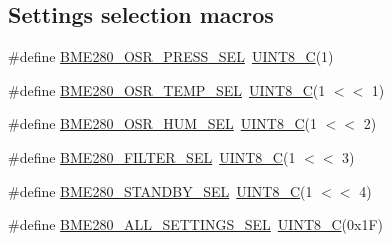 \subsection*{Settings selection macros}
\begin{DoxyCompactItemize}
\item 
\#define \hyperlink{group___b_m_e280_gae22bd3e6b1bb71fe30633f4d84168750}{B\+M\+E280\+\_\+\+O\+S\+R\+\_\+\+P\+R\+E\+S\+S\+\_\+\+S\+EL}~\hyperlink{group___b_m_e280_gacd2aa09844a8a245cf7fdbb808e215e5}{U\+I\+N\+T8\+\_\+C}(1)
\item 
\#define \hyperlink{group___b_m_e280_ga407647f6182e1bd2338e226ea0ef93af}{B\+M\+E280\+\_\+\+O\+S\+R\+\_\+\+T\+E\+M\+P\+\_\+\+S\+EL}~\hyperlink{group___b_m_e280_gacd2aa09844a8a245cf7fdbb808e215e5}{U\+I\+N\+T8\+\_\+C}(1 $<$$<$ 1)
\item 
\#define \hyperlink{group___b_m_e280_gacdab9f807404ce931f3ec87b680986ba}{B\+M\+E280\+\_\+\+O\+S\+R\+\_\+\+H\+U\+M\+\_\+\+S\+EL}~\hyperlink{group___b_m_e280_gacd2aa09844a8a245cf7fdbb808e215e5}{U\+I\+N\+T8\+\_\+C}(1 $<$$<$ 2)
\item 
\#define \hyperlink{group___b_m_e280_ga9d10214add03956eb741957acb90083e}{B\+M\+E280\+\_\+\+F\+I\+L\+T\+E\+R\+\_\+\+S\+EL}~\hyperlink{group___b_m_e280_gacd2aa09844a8a245cf7fdbb808e215e5}{U\+I\+N\+T8\+\_\+C}(1 $<$$<$ 3)
\item 
\#define \hyperlink{group___b_m_e280_gafa104771609eec5766a2f0794fc4374b}{B\+M\+E280\+\_\+\+S\+T\+A\+N\+D\+B\+Y\+\_\+\+S\+EL}~\hyperlink{group___b_m_e280_gacd2aa09844a8a245cf7fdbb808e215e5}{U\+I\+N\+T8\+\_\+C}(1 $<$$<$ 4)
\item 
\#define \hyperlink{group___b_m_e280_ga8ef4306eed189332ad4c4db8003132c8}{B\+M\+E280\+\_\+\+A\+L\+L\+\_\+\+S\+E\+T\+T\+I\+N\+G\+S\+\_\+\+S\+EL}~\hyperlink{group___b_m_e280_gacd2aa09844a8a245cf7fdbb808e215e5}{U\+I\+N\+T8\+\_\+C}(0x1\+F)
\end{DoxyCompactItemize}
